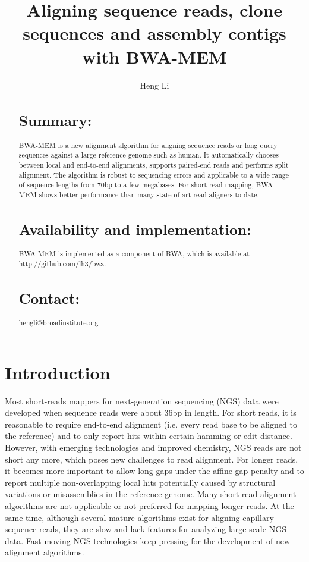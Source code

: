 \documentclass{bioinfo}
\begin{document}

\title{Aligning sequence reads, clone sequences and assembly contigs with BWA-MEM}

\author[Li]{Heng Li}

\address{Broad Institute of Harvard and MIT, 7 Cambridge Center, Cambridge, MA 02142, USA}

\maketitle

\begin{abstract}
\section{Summary:} BWA-MEM is a new alignment algorithm for aligning sequence
reads or long query sequences against a large reference genome such as human.
It automatically chooses between local and end-to-end alignments, supports
paired-end reads and performs split alignment. The algorithm is robust to
sequencing errors and applicable to a wide range of sequence lengths from 70bp
to a few megabases. For short-read mapping, BWA-MEM shows better performance
than many state-of-art read aligners to date.

\section{Availability and implementation:} BWA-MEM is implemented as a
component of BWA, which is available at http://github.com/lh3/bwa.

\section{Contact:} hengli@broadinstitute.org
\end{abstract}

\section{Introduction}

Most short-reads mappers for next-generation sequencing (NGS) data were
developed when sequence reads were about 36bp in length. For short reads, it is
reasonable to require end-to-end alignment (i.e. every read base to be aligned
to the reference) and to only report hits within certain hamming or edit
distance.  However, with emerging technologies and improved chemistry, NGS
reads are not short any more, which poses new challenges to read alignment. For
longer reads, it becomes more important to allow long gaps under the affine-gap
penalty and to report multiple non-overlapping local hits potentially caused by
structural variations or misassemblies in the reference genome. Many short-read
alignment algorithms are not applicable or not preferred for mapping longer
reads. At the same time, although several mature algorithms exist for aligning
capillary sequence reads, they are slow and lack features for analyzing
large-scale NGS data. Fast moving NGS technologies keep pressing for the
development of new alignment algorithms.
\end{document}
